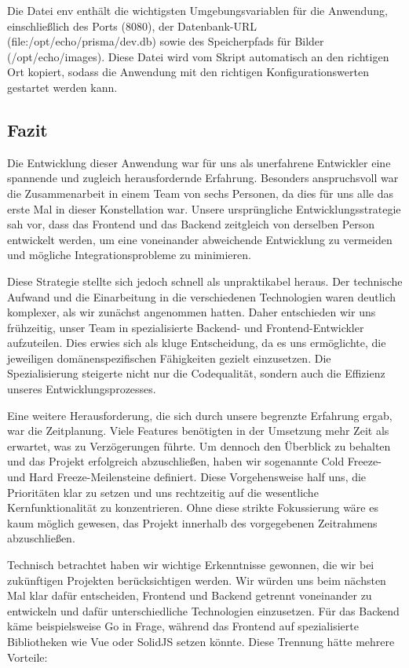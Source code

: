 \documentclass[a4paper,12pt]{article}
\begin{document}
Die Datei env enthält die wichtigsten Umgebungsvariablen für die Anwendung,
einschließlich des Ports (8080), der Datenbank-URL
(file:/opt/echo/prisma/dev.db) sowie des Speicherpfads für Bilder
(/opt/echo/images). Diese Datei wird vom Skript automatisch an den
richtigen Ort kopiert, sodass die Anwendung mit den richtigen
Konfigurationswerten gestartet werden kann.

\newpage
\subsection{Fazit}
Die Entwicklung dieser Anwendung war für uns als unerfahrene
Entwickler eine spannende und zugleich herausfordernde Erfahrung. Besonders
anspruchsvoll war die Zusammenarbeit in einem Team von sechs Personen, da dies
für uns alle das erste Mal in dieser Konstellation war. Unsere ursprüngliche
Entwicklungsstrategie sah vor, dass das Frontend und das Backend zeitgleich von
derselben Person entwickelt werden, um eine voneinander abweichende Entwicklung
zu vermeiden und mögliche Integrationsprobleme zu minimieren.

Diese Strategie stellte sich jedoch schnell als unpraktikabel heraus. Der
technische Aufwand und die Einarbeitung in die verschiedenen Technologien waren
deutlich komplexer, als wir zunächst angenommen hatten. Daher entschieden wir
uns frühzeitig, unser Team in spezialisierte Backend- und Frontend-Entwickler
aufzuteilen. Dies erwies sich als kluge Entscheidung, da es uns ermöglichte,
die jeweiligen domänenspezifischen Fähigkeiten gezielt einzusetzen. Die
Spezialisierung steigerte nicht nur die Codequalität, sondern auch die
Effizienz unseres Entwicklungsprozesses.

Eine weitere Herausforderung, die sich durch unsere begrenzte Erfahrung ergab,
war die Zeitplanung. Viele Features benötigten in der Umsetzung mehr Zeit als
erwartet, was zu Verzögerungen führte. Um dennoch den Überblick zu behalten und
das Projekt erfolgreich abzuschließen, haben wir sogenannte Cold Freeze- und
Hard Freeze-Meilensteine definiert. Diese Vorgehensweise half uns, die
Prioritäten klar zu setzen und uns rechtzeitig auf die wesentliche
Kernfunktionalität zu konzentrieren. Ohne diese strikte Fokussierung wäre es
kaum möglich gewesen, das Projekt innerhalb des vorgegebenen Zeitrahmens
abzuschließen.

Technisch betrachtet haben wir wichtige Erkenntnisse gewonnen, die wir bei
zukünftigen Projekten berücksichtigen werden. Wir würden uns beim nächsten Mal
klar dafür entscheiden, Frontend und Backend getrennt voneinander zu entwickeln
und dafür unterschiedliche Technologien einzusetzen. Für das Backend käme
beispielsweise Go in Frage, während das Frontend auf spezialisierte
Bibliotheken wie Vue oder SolidJS setzen könnte. Diese Trennung hätte mehrere
Vorteile:
\end{document}
